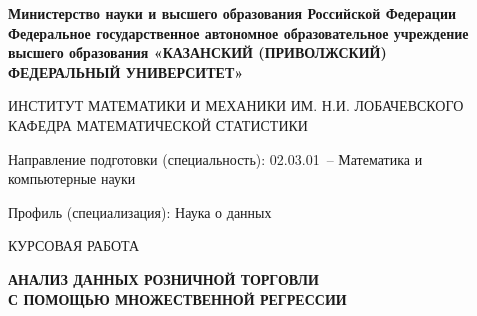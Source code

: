 \newcommand{\CourseworkTitle}{АНАЛИЗ ДАННЫХ РОЗНИЧНОЙ ТОРГОВЛИ\\
С ПОМОЩЬЮ МНОЖЕСТВЕННОЙ РЕГРЕССИИ}
\newcommand{\CourseworkCourse}{3}
\newcommand{\CourseworkGroup}{05-308}
\newcommand{\CourseworkStudent}{Кибардин М.\,О.}
\newcommand{\CourseworkSupervisor}{Салимов Р.\,Ф.}
\newcommand{\CourseworkSupervisorDegree}{канд. физ.-мат. наук}
\newcommand{\CourseworkYear}{2026}
\newcommand{\CourseworkDate}{«\underline{\hspace{9mm}}»\enspace
\underline{\hspace{23mm}}\enspace\CourseworkYear~г.}

\begin{titlepage}
\thispagestyle{empty}
\noindent
\begin{minipage}[t][\dimexpr\textheight-\topskip\relax][t]{\textwidth}
\fontsize{14bp}{18.2bp}\selectfont
\setlength{\parindent}{0pt}
\setlength{\parskip}{0pt}
\vspace{0pt}
{\centering
\textbf{Министерство науки и высшего образования Российской Федерации\\
Федеральное государственное автономное образовательное учреждение\\
высшего образования «КАЗАНСКИЙ (ПРИВОЛЖСКИЙ)\\
ФЕДЕРАЛЬНЫЙ УНИВЕРСИТЕТ»}\par}
\vspace{16mm}
{\centering
ИНСТИТУТ МАТЕМАТИКИ И МЕХАНИКИ ИМ. Н.И. ЛОБАЧЕВСКОГО\\
КАФЕДРА МАТЕМАТИЧЕСКОЙ СТАТИСТИКИ\par}
\vspace{14mm}
Направление подготовки (специальность): 02.03.01~-- Математика и
компьютерные науки\par
Профиль (специализация): Наука о данных\par
\vspace{28mm}
{\centering КУРСОВАЯ РАБОТА\par}
\vspace{8mm}
\begin{minipage}[t][21mm][t]{\textwidth}
\centering
{}\fontsize{14bp}{16.1bp}\selectfont
\textbf{\CourseworkTitle}\par

\end{minipage}
\end{minipage}
\end{titlepage}
